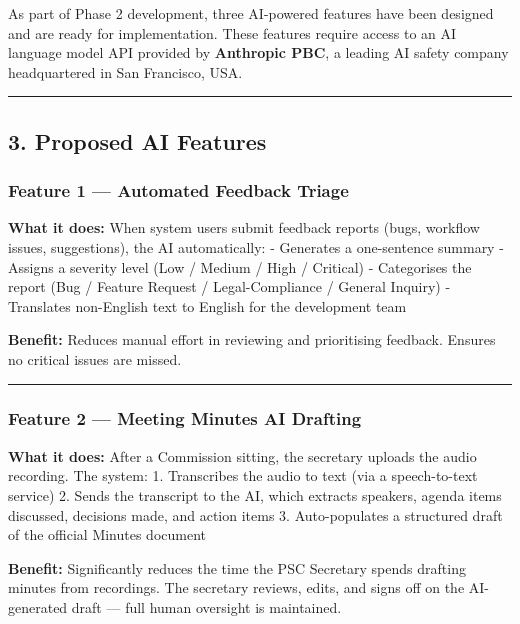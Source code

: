 \documentclass[
]{article}
\begin{document}
As part of Phase 2 development, three AI-powered features have been
designed and are ready for implementation. These features require access
to an AI language model API provided by \textbf{Anthropic PBC}, a
leading AI safety company headquartered in San Francisco, USA.

\begin{center}\rule{0.5\linewidth}{0.5pt}\end{center}

\subsection{3. Proposed AI Features}\label{proposed-ai-features}

\subsubsection{Feature 1 --- Automated Feedback
Triage}\label{feature-1-automated-feedback-triage}

\textbf{What it does:} When system users submit feedback reports (bugs,
workflow issues, suggestions), the AI automatically: - Generates a
one-sentence summary - Assigns a severity level (Low / Medium / High /
Critical) - Categorises the report (Bug / Feature Request /
Legal-Compliance / General Inquiry) - Translates non-English text to
English for the development team

\textbf{Benefit:} Reduces manual effort in reviewing and prioritising
feedback. Ensures no critical issues are missed.

\begin{center}\rule{0.5\linewidth}{0.5pt}\end{center}

\subsubsection{Feature 2 --- Meeting Minutes AI
Drafting}\label{feature-2-meeting-minutes-ai-drafting}

\textbf{What it does:} After a Commission sitting, the secretary uploads
the audio recording. The system: 1. Transcribes the audio to text (via a
speech-to-text service) 2. Sends the transcript to the AI, which
extracts speakers, agenda items discussed, decisions made, and action
items 3. Auto-populates a structured draft of the official Minutes
document

\textbf{Benefit:} Significantly reduces the time the PSC Secretary
spends drafting minutes from recordings. The secretary reviews, edits,
and signs off on the AI-generated draft --- full human oversight is
maintained.
\end{document}
